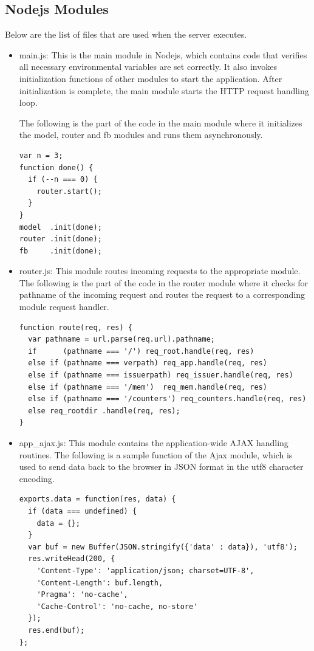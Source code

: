 \subsection{Nodejs Modules}
Below are the list of files that are used when the server executes.

\begin{itemize}
\item main.js: This is the main module in Nodejs, which contains code that verifies all necessary environmental variables are set correctly. It also invokes initialization functions of other modules to start the application.  After initialization is complete, the main module starts the HTTP request handling loop. 

The following is the part of the code in the main module where it initializes the model, router and fb modules and runs them asynchronously. 
\begin{lstlisting}
var n = 3;
function done() {
  if (--n === 0) {
    router.start();
  }  
}
model  .init(done);
router .init(done);
fb     .init(done);
\end{lstlisting} 

\item router.js: This module routes incoming requests to the appropriate module. The following is the part of the code in the router module where it checks for pathname of the incoming request and routes the request to a corresponding module request handler.
\begin{lstlisting}
function route(req, res) {
  var pathname = url.parse(req.url).pathname;
  if      (pathname === '/') req_root.handle(req, res)
  else if (pathname === verpath) req_app.handle(req, res)
  else if (pathname === issuerpath) req_issuer.handle(req, res)
  else if (pathname === '/mem')  req_mem.handle(req, res)
  else if (pathname === '/counters') req_counters.handle(req, res)
  else req_rootdir .handle(req, res);
}
\end{lstlisting} 


\item app{\_}ajax.js: This module contains the application-wide AJAX handling routines. The following is a sample function of the Ajax module, which is used to send data back to the browser in JSON format in the utf8 character encoding.
\begin{lstlisting}
exports.data = function(res, data) {
  if (data === undefined) {
    data = {};
  }
  var buf = new Buffer(JSON.stringify({'data' : data}), 'utf8');
  res.writeHead(200, {
    'Content-Type': 'application/json; charset=UTF-8',
    'Content-Length': buf.length,
    'Pragma': 'no-cache',
    'Cache-Control': 'no-cache, no-store'
  });
  res.end(buf);
};
\end{lstlisting} 



\end{itemize}
